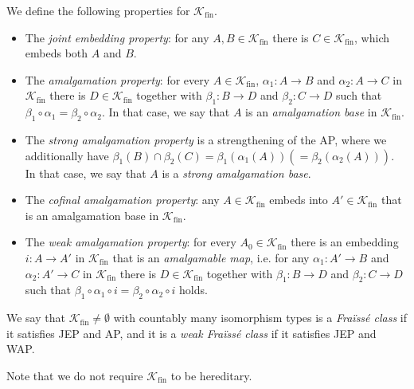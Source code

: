 \documentclass[oneside,notitlepage,12pt]{article}
\theoremstyle{definition}
\theoremstyle{remark}
\newcommand \maps {\colon} %
\newcommand \K {\mathscr{K}}
\newcommand \fin {{\operatorname{fin}}}
\begin{document}
We define the following properties for $\K_\fin$.
\begin{itemize}
    \item[(JEP)] The {\it joint embedding property}: for any $A,B\in\mathcal{K}_\fin$ there is $C\in \mathcal{K}_\fin$, which embeds both $A$ and $B$.
    
    \item[(AP)] The {\it amalgamation property}: for every $A\in \mathcal{K}_\fin$, $\alpha_1\colon A\to B$ and $\alpha_2\colon A\to C$ in $\mathcal{K}_\fin$ there is $D\in \mathcal{K}_\fin$ together with $\beta_1\colon B\to D$ and $\beta_2\colon C\to D$ such that $\beta_1\circ\alpha_1=\beta_2\circ \alpha_2$.
    In that case, we say that $A$ is an {\it amalgamation base} in $\mathcal{K}_\fin$.
    
    \item[(SAP)] The {\it strong amalgamation property} is a strengthening of the AP, where we additionally have $\beta_1(B)\cap \beta_2(C)=\beta_1(\alpha_1(A)) (=\beta_2(\alpha_2(A))) $.  In that case, we say that $A$ is a {\it strong amalgamation base}. 
    \item[(CAP)] The {\it cofinal amalgamation property}:  any $A\in \mathcal{K}_\fin$ embeds into $A'\in \mathcal{K}_\fin$ that is an amalgamation base in $\mathcal{K}_\fin$.
    
    \item[(WAP)] The \emph{weak amalgamation property}:
    for every $A_0 \in \K_\fin$ there is an embedding $i\maps A \to A'$ in $\K_\fin$ that is an \emph{amalgamable map}, i.e. for any $\alpha_1\colon A' \to B$ and $\alpha_2\colon A'\to C$ in $\mathcal{K}_\fin$ there is $D\in \mathcal{K}_\fin$ together with $\beta_1\colon B\to D$ and $\beta_2\colon C\to D$ such that $\beta_1\circ \alpha_1\circ i=\beta_2\circ \alpha_2\circ i$ holds.
\end{itemize}

We say that $\K_\fin \neq \emptyset$ with countably many isomorphism types is a \emph{Fraïssé class} if it satisfies JEP and AP, and it is a \emph{weak Fraïssé class} if it satisfies JEP and WAP.

Note that we do not require $\K_\fin$ to be hereditary.

\medskip
\end{document}
